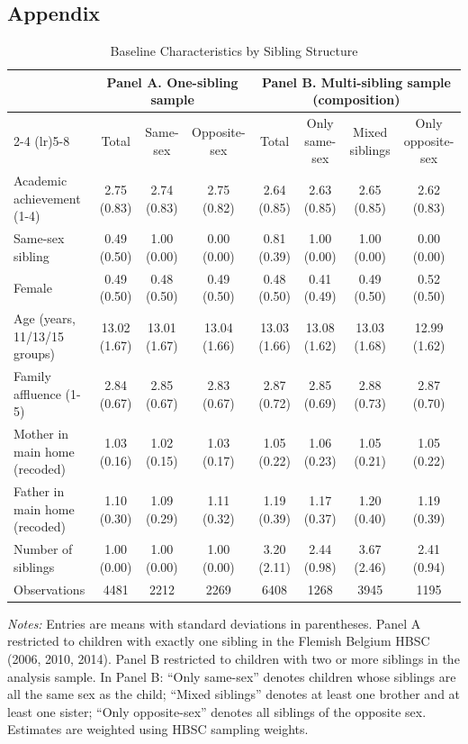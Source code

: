 \documentclass[12pt]{article}
\begin{document}
\clearpage
\begin{landscape}
\section{Appendix}

\begin{table}[htpb]\centering
\caption{Baseline Characteristics by Sibling Structure}
\label{tab:descriptives}
\begin{footnotesize}
\begin{tabular}{l*{7}{c}} \toprule
 & \multicolumn{3}{c}{Panel A. One-sibling sample} &   \multicolumn{4}{c}{Panel B. Multi-sibling sample (composition)} \\
\cmidrule(lr){2-4} \cmidrule(lr){5-8}
 & Total & Same-sex & Opposite-sex & Total & Only same-sex & Mixed siblings & Only opposite-sex \\
\midrule
Academic achievement (1-4) & 2.75 (0.83) & 2.74 (0.83) & 2.75 (0.82) & 2.64 (0.85) & 2.63 (0.85) & 2.65 (0.85) & 2.62 (0.83) \\
Same-sex sibling & 0.49 (0.50) & 1.00 (0.00) & 0.00 (0.00) & 0.81 (0.39) & 1.00 (0.00) & 1.00 (0.00) & 0.00 (0.00) \\
Female & 0.49 (0.50) & 0.48 (0.50) & 0.49 (0.50) & 0.48 (0.50) & 0.41 (0.49) & 0.49 (0.50) & 0.52 (0.50) \\
Age (years, 11/13/15 groups) & 13.02 (1.67) & 13.01 (1.67) & 13.04 (1.66) & 13.03 (1.66) & 13.08 (1.62) & 13.03 (1.68) & 12.99 (1.62) \\
Family affluence (1-5) & 2.84 (0.67) & 2.85 (0.67) & 2.83 (0.67) & 2.87 (0.72) & 2.85 (0.69) & 2.88 (0.73) & 2.87 (0.70) \\
Mother in main home (recoded) & 1.03 (0.16) & 1.02 (0.15) & 1.03 (0.17) & 1.05 (0.22) & 1.06 (0.23) & 1.05 (0.21) & 1.05 (0.22) \\
Father in main home (recoded) & 1.10 (0.30) & 1.09 (0.29) & 1.11 (0.32) & 1.19 (0.39) & 1.17 (0.37) & 1.20 (0.40) & 1.19 (0.39) \\
Number of siblings & 1.00 (0.00) & 1.00 (0.00) & 1.00 (0.00) & 3.20 (2.11) & 2.44 (0.98) & 3.67 (2.46) & 2.41 (0.94) \\
\midrule
Observations & 4481 & 2212 & 2269 & 6408 & 1268 & 3945 & 1195 \\
\bottomrule
\end{tabular}
\begin{minipage}{0.95\textwidth}
\footnotesize
\emph{Notes:} Entries are means with standard deviations in parentheses.
Panel A restricted to children with exactly one sibling in the Flemish Belgium HBSC (2006, 2010, 2014).
Panel B restricted to children with two or more siblings in the analysis sample.
In Panel B: “Only same-sex” denotes children whose siblings are all the same sex as the child; 
“Mixed siblings” denotes at least one brother and at least one sister; 
“Only opposite-sex” denotes all siblings of the opposite sex. 
Estimates are weighted using HBSC sampling weights.
\end{minipage}
\end{footnotesize}
\end{table}
\end{landscape}
\end{document}
